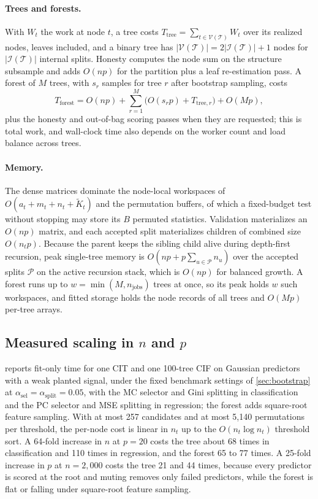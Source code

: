 \paragraph{Trees and forests.}
With $W_t$ the work at node $t$, a tree costs
$T_{\mathrm{tree}}=\sum_{t\in\mathcal{V}(\mathcal{T})} W_t$ over its realized
nodes, leaves included, and a binary tree has
$|\mathcal{V}(\mathcal{T})|=2|\mathcal{I}(\mathcal{T})|+1$ nodes for
$|\mathcal{I}(\mathcal{T})|$ internal splits. Honesty computes the node
sum on the structure subsample and adds $O(np)$ for the partition plus a leaf
re-estimation pass. A forest of $M$ trees, with $s_r$ samples for tree $r$
after bootstrap sampling, costs
\begin{equation}
  T_{\mathrm{forest}}
  = O(np) + \sum_{r=1}^{M}\bigl(O(s_r p) + T_{\mathrm{tree},r}\bigr) + O(Mp),
\end{equation}
plus the honesty and out-of-bag scoring passes when they are requested; this
is total work, and wall-clock time also depends on the worker count and load
balance across trees.

\paragraph{Memory.}
The dense matrices dominate the node-local workspaces of
$O(a_t+m_t+n_t+\tilde{K}_t)$ and the permutation buffers, of which a
fixed-budget test without stopping may store its $B$ permuted statistics.
Validation materializes an $O(np)$ matrix, and each accepted split
materializes children of combined size $O(n_t p)$. Because the parent keeps the
sibling child alive during depth-first recursion, peak single-tree memory is
$O(np + p\sum_{u\in\mathcal{P}} n_u)$ over the accepted splits $\mathcal{P}$ on
the active recursion stack, which is $O(np)$ for balanced growth. A forest runs
up to $w=\min(M,n_{\mathrm{jobs}})$ trees at once, so its peak holds $w$ such
workspaces, and fitted storage holds the node records of all trees and $O(Mp)$
per-tree arrays.

\subsection{Measured scaling in \texorpdfstring{$n$}{n} and \texorpdfstring{$p$}{p}}
\label{app:scaling-curves}

 reports fit-only time for one CIT and one 100-tree CIF
on Gaussian predictors with a weak planted signal, under the fixed benchmark
settings of \cref{sec:bootstrap} at
$\alpha_{\mathrm{sel}}=\alpha_{\mathrm{split}}=0.05$, with the MC selector and
Gini splitting in classification and the PC selector and MSE splitting in
regression; the forest adds square-root feature sampling. With at most 257 candidates and at most
5{,}140 permutations per threshold, the per-node cost is linear in $n_t$ up to the
$O(n_t \log n_t)$ threshold sort. A
64-fold increase in $n$ at $p=20$ costs the tree about 68 times in
classification and 110 times in regression, and the forest 65 to 77 times. A
25-fold increase in $p$ at $n=2{,}000$ costs the tree 21 and 44 times, because
every predictor is scored at the root and muting removes only failed
predictors, while the forest is flat or falling under square-root feature
sampling.


